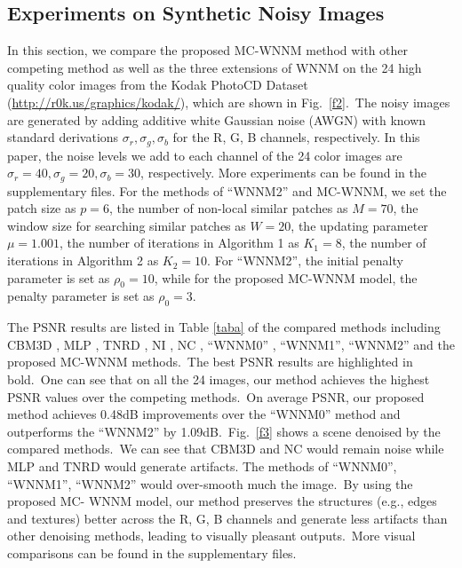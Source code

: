 \documentclass[10pt,twocolumn,letterpaper,sort&compress]{article}
\begin{document}
\subsection{Experiments on Synthetic Noisy Images}
In this section, we compare the proposed MC-WNNM method with other competing method \cite{cbm3d,mlp,chen2015learning,noiseclinic,neatimage} as well as the three extensions of WNNM \cite{wnnmijcv} on the 24 high quality color images from the Kodak PhotoCD Dataset (\url{http://r0k.us/graphics/kodak/}), which are shown in Fig.\ \ref{f2}.\ The noisy images are generated by adding additive white Gaussian noise (AWGN) with known standard derivations $\sigma_{r}, \sigma_{g}, \sigma_{b}$ for the R, G, B channels, respectively. In this paper, the noise levels we add to each channel of the 24 color images are $\sigma_{r}=40, \sigma_{g}=20, \sigma_{b}=30$, respectively. More experiments can be found in the supplementary files. For the methods of ``WNNM2'' and MC-WNNM, we set the patch size as $p = 6$, the number of non-local similar patches as $M = 70$, the window size for searching similar patches as $W = 20$, the updating parameter $\mu=1.001$, the number of iterations in Algorithm 1 as $K_{1} = 8$, the number of iterations in Algorithm 2 as $K_{2}=10$. For ``WNNM2'', the initial penalty parameter is set as $\rho_{0}=10$, while for the proposed MC-WNNM model, the penalty parameter is set as $\rho_{0}=3$.

The PSNR results are listed in Table \ref{taba} of the compared methods including CBM3D \cite{cbm3d}, MLP \cite{mlp}, TNRD \cite{chen2015learning}, NI \cite{neatimage}, NC \cite{noiseclinic,ncwebsite}, ``WNNM0'' \cite{wnnmijcv}, ``WNNM1'', ``WNNM2'' and the proposed MC-WNNM methods.\ The best PSNR results are highlighted in bold.\ One can see that on all the 24 images, our method achieves the highest PSNR values over the competing methods.\ On average PSNR, our proposed method achieves 0.48dB improvements over the ``WNNM0'' method and outperforms the ``WNNM2'' by 1.09dB.\ Fig.\ \ref{f3} shows a scene denoised by the compared methods.\ We can see that CBM3D and NC would remain noise while MLP and TNRD would generate artifacts. The methods of ``WNNM0'', ``WNNM1'', ``WNNM2'' would over-smooth much the image.\ By using the proposed MC- WNNM model, our method preserves the structures (e.g., edges and textures) better across the R, G, B channels and generate less artifacts than other denoising methods, leading to visually pleasant outputs.\ More visual comparisons can be found in the supplementary files.
\end{document}
